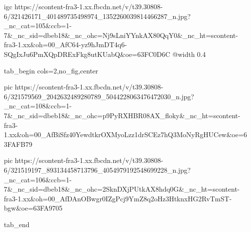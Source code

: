 
\ifcmt
  igc https://scontent-fra3-1.xx.fbcdn.net/v/t39.30808-6/321426171_401489735498974_1352260039814466287_n.jpg?_nc_cat=105&ccb=1-7&_nc_sid=dbeb18&_nc_ohc=Nj9sLniYYnkAX80QqY0&_nc_ht=scontent-fra3-1.xx&oh=00_AfC64-yz9hJmDT4q6-SQgIxJu6PmXQpDRExFkg8utKUabQ&oe=63FC0D6C
  @width 0.4
\fi

\begin{center}
\begin{minipage}{\textwidth}


\ifcmt
  tab_begin cols=2,no_fig,center

     pic https://scontent-fra3-1.xx.fbcdn.net/v/t39.30808-6/321579569_2042632489280789_5044228063476472030_n.jpg?_nc_cat=108&ccb=1-7&_nc_sid=dbeb18&_nc_ohc=p9PyRXHBR08AX_floky&_nc_ht=scontent-fra3-1.xx&oh=00_AfBiSfz40YewdtkrOXMyoLzz1drSCEz7hQ3MoNyRgHUCew&oe=63FAFB79

     pic https://scontent-fra3-1.xx.fbcdn.net/v/t39.30808-6/321519197_893134458713796_4054979192548699228_n.jpg?_nc_cat=106&ccb=1-7&_nc_sid=dbeb18&_nc_ohc=2SknDXjPUtkAX8hdq0G&_nc_ht=scontent-fra3-1.xx&oh=00_AfDAnOBwgr0IZgPcj9YmZ8q2oHz3HtknxHG2RvTmST-bgw&oe=63FA9705

  tab_end
\fi

\end{minipage}
\end{center}


